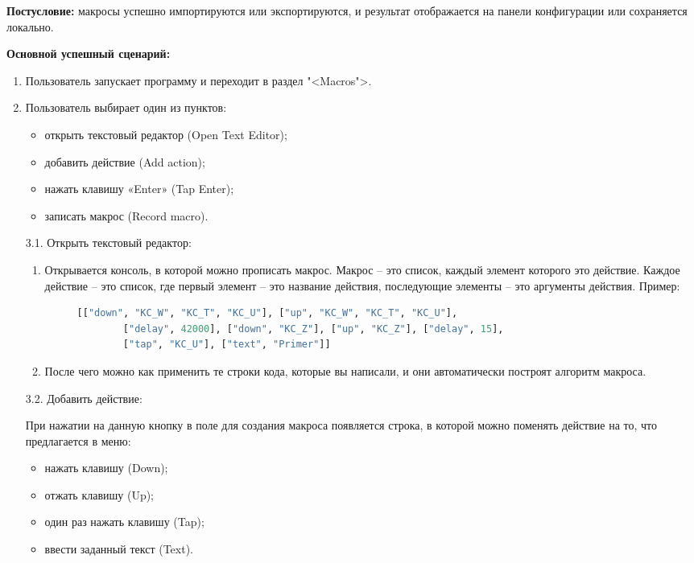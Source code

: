\textbf{Постусловие:} макросы успешно импортируются или экспортируются, и результат отображается на панели конфигурации или сохраняется локально.

\textbf{Основной успешный сценарий:}

\begin{enumerate}
\item Пользователь запускает программу и переходит в раздел "<Macros">.
\item Пользователь выбирает один из пунктов:

\begin{itemize}
	\item открыть текстовый редактор (Open Text Editor);
	\item добавить действие (Add action);
	\item нажать клавишу «Enter» (Tap Enter);
	\item записать макрос (Record macro).
\end{itemize}

\item[3.1.] Открыть текстовый редактор:

\begin{enumerate}
	\item Открывается консоль, в которой можно прописать макрос. Макрос – это список, каждый элемент которого это действие. Каждое действие – это список, где первый элемент – это название действия, последующие элементы – это аргументы действия. Пример:
	
	\begin{figure}[H]
		\begin{lstlisting}[language=Python]
		[["down", "KC_W", "KC_T", "KC_U"], ["up", "KC_W", "KC_T", "KC_U"],
		["delay", 42000], ["down", "KC_Z"], ["up", "KC_Z"], ["delay", 15],
		["tap", "KC_U"], ["text", "Primer"]]
		\end{lstlisting}
	\end{figure}
	\item После чего можно как применить те строки кода, которые вы написали, и они автоматически построят алгоритм макроса.
\end{enumerate}

\item[3.2.] Добавить действие:

При нажатии на данную кнопку в поле для создания макроса появляется строка, в которой можно поменять действие на то, что предлагается в меню:

\begin{itemize}
	\item нажать клавишу (Down);
	\item отжать клавишу (Up);
	\item один раз нажать клавишу (Tap);
	\item ввести заданный текст (Text).
\end{itemize}


\end{enumerate}
